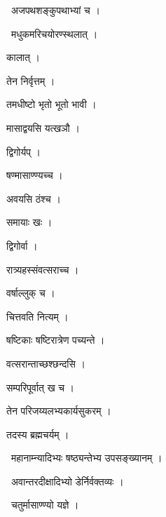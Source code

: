 \documentclass[10pt, openany, oneside]{book}
\begin{document}
\par\noindent\hspace{1.5em}{\vps वा॰}~{\qt अजपथशङ्कुपथाभ्यां च ।}

\par\noindent\hspace{1.5em}{\vps वा॰}~{\qt मधुकमरिचयोरण्स्थलात् ।}

\noindent कालात् ।

\noindent तेन निर्वृत्तम् ।

\noindent तमधीष्टो भृतो भूतो भावी ।

\noindent मासाद्वयसि यत्खञौ ।

\noindent द्विगोर्यप् ।

\noindent षण्मासाण्ण्यच्च ।

\noindent अवयसि ठंश्च ।

\noindent समायाः खः ।

\noindent द्विगोर्वा ।

\noindent रात्र्यहस्संवत्सराच्च ।

\noindent वर्षाल्लुक् च ।

\noindent चित्तवति नित्यम् ।

\noindent षष्टिकाः षष्टिरात्रेण पच्यन्ते ।

\noindent वत्सरान्ताच्छश्छन्दसि ।

\noindent सम्परिपूर्वात् ख च ।

\noindent तेन परिजय्यलभ्यकार्यसुकरम् ।

\noindent तदस्य ब्रह्मचर्यम् ।

\par\noindent\hspace{1.5em}{\vps वा॰}~{\qt महानाम्न्यादिभ्यः षष्ठ्यन्तेभ्य उपसङ्ख्यानम् ।}

\par\noindent\hspace{1.5em}{\vps वा॰}~{\qt अवान्तरदीक्षादिभ्यो डेर्निर्वक्तव्यः ।}

\par\noindent\hspace{1.5em}{\vps वा॰}~{\qt चतुर्मासाण्ण्यो यज्ञे ।}
\end{document}
